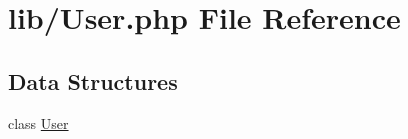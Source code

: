 \hypertarget{_user_8php}{\section{lib/\-User.php File Reference}
\label{_user_8php}
}
\subsection*{Data Structures}
\begin{DoxyCompactItemize}
\item 
class \hyperlink{class_user}{User}
\end{DoxyCompactItemize}

